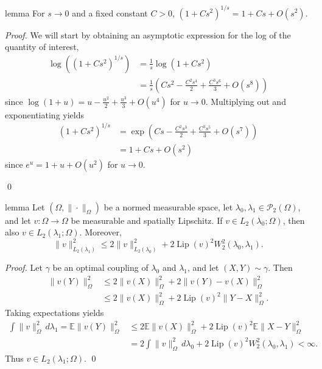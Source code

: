 \documentclass[11pt]{article}
\begin{document}
\begin{restatable}{lemma}{}
    For $s \rightarrow 0$ and a fixed constant $C > 0$, $(1 + Cs^2)^{1/s} = 1 + Cs + O(s^2).$ \label{recurrence relation bound}
\end{restatable}
\noindent \textit{Proof.} We will start by obtaining an asymptotic expression for the log of the quantity of interest,
\begin{align*}
    \log\left((1 + Cs^2)^{1/s}\right) &= \frac{1}{s}\log(1 + Cs^2) \\
    &= \frac{1}{s}\left(Cs^2 - \frac{C^2s^4}{2} + \frac{C^3s^6}{3} + O(s^8)\right)
\end{align*}
since $\log(1 + u) = u - \frac{u^2}{2} + \frac{u^3}{3} +O(u^4)$ for $u \rightarrow 0$. Multiplying out and exponentiating yields
\begin{align*}
    (1 + Cs^2)^{1/s} &= \exp\left(Cs - \frac{C^2s^3}{2} + \frac{C^3s^5}{3} + O(s^7)\right) \\
    &= 1 + Cs + O(s^2)
\end{align*}
since $e^u = 1 + u + O(u^2)$ for $u \rightarrow 0$.

\qed{}

\begin{restatable}{lemma}{} \label{L2}
Let $(\Omega,\|\cdot\|_\Omega)$ be a normed measurable space, let
$\lambda_0,\lambda_1\in\mathcal P_2(\Omega)$, and let
$v:\Omega\to\Omega$ be measurable and spatially Lipschitz. If
$v\in L_2(\lambda_0;\Omega)$, then also $v\in L_2(\lambda_1;\Omega)$.
Moreover,
\[
\|v\|_{L_2(\lambda_1)}^2
\le
2\|v\|_{L_2(\lambda_0)}^2
+
2{\operatorname{Lip}}(v)^2 W_2^2(\lambda_0,\lambda_1).
\]
\end{restatable}

\noindent\textit{Proof.}
Let $\gamma$ be an optimal coupling of $\lambda_0$ and $\lambda_1$, and let
$(X,Y)\sim \gamma$. Then
\begin{align*}
\|v(Y)\|_\Omega^2
&\le 2\|v(X)\|_\Omega^2 + 2\|v(Y)-v(X)\|_\Omega^2 \\
&\le 2\|v(X)\|_\Omega^2 + 2{\operatorname{Lip}}(v)^2\|Y-X\|_\Omega^2.
\end{align*}
Taking expectations yields
\begin{align*}
\int \|v\|_\Omega^2\,d\lambda_1
= \mathbb E\|v(Y)\|_\Omega^2
&\le
2\mathbb E\|v(X)\|_\Omega^2
+
2{\operatorname{Lip}}(v)^2 \mathbb E\|X-Y\|_\Omega^2 \\
&=
2\int \|v\|_\Omega^2\,d\lambda_0
+
2{\operatorname{Lip}}(v)^2 W_2^2(\lambda_0,\lambda_1)
<\infty.
\end{align*}
Thus $v\in L_2(\lambda_1;\Omega)$.
\qed{}
\end{document}
